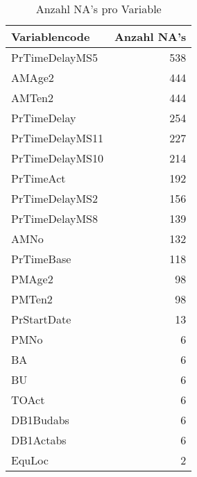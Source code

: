\begin{table}[htbp]
	
	\centering
	\caption{Anzahl NA's pro Variable}
	\begin{tabular}{lr}
		\textbf{Variablencode} & \multicolumn{1}{l}{\textbf{Anzahl NA's}} \\\hline
		PrTimeDelayMS5 & 538 \\
		AMAge2 & 444 \\
		AMTen2 & 444 \\
		PrTimeDelay & 254 \\
		PrTimeDelayMS11 & 227 \\
		PrTimeDelayMS10 & 214 \\
		PrTimeAct & 192 \\
		PrTimeDelayMS2 & 156 \\
		PrTimeDelayMS8 & 139 \\
		AMNo  & 132 \\
		PrTimeBase & 118 \\
		PMAge2 & 98 \\
		PMTen2 & 98 \\
		PrStartDate & 13 \\
		PMNo  & 6 \\
		BA    & 6 \\
		BU    & 6 \\
		TOAct & 6 \\
		DB1Budabs & 6 \\
		DB1Actabs & 6 \\
		EquLoc & 2 \\
	\end{tabular}%
	\label{tab:na}%
\end{table}%
\newpage
